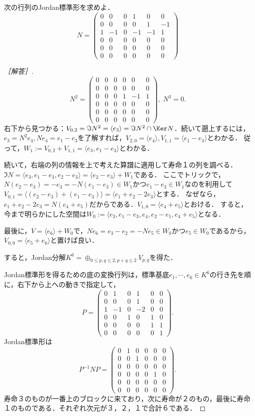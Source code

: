 \documentclass[uplatex, dvipdfmx]{jsreport}
\begin{document}
\begin{problem}
    次の行列のJordan標準形を求めよ．
    \[N=\begin{pmatrix}0&0&0&1&0&0\\0&0&0&0&1&-1\\1&-1&0&-1&-1&1\\0&0&0&0&0&0\\0&0&0&0&0&0\\0&0&0&0&0&0\end{pmatrix}\]
\end{problem}
\begin{proof}[［解答］]
    \[N^2=\begin{pmatrix}0&0&0&0&0&0\\0&0&0&0&0&0\\0&0&0&1&-1&1\\0&0&0&0&0&0\\0&0&0&0&0&0\\0&0&0&0&0&0\end{pmatrix},\;N^3=0.\]
    右下から見つかる：$V_{0,2}=\Im N^2=\langle e_3\rangle=\Im N^2\cap\Ker N$．続いて遡上するには，$e_3=N^2e_4,Ne_4=e_1-e_3$を了解すれば，$V_{2,0}=\langle  e_4\rangle,V_{1,1}=\langle e_1-e_3\rangle$とわかる．
    従って，$W_1:=V_{0,2}+V_{1,1}=\langle e_3,e_1-e_3\rangle$とわかる．

    続いて，右端の列の情報を上で考えた算譜に適用して寿命１の列を調べる．
    $\Im N=\langle  e_3,e_1-e_3,e_2-e_3\rangle=\langle e_2-e_3\rangle+W_1$である．
    ここでトリックで，$N(e_2-e_3)=-e_3=-N(e_1-e_3)\in W_1$かつ$e_1-e_3\in W_1$なのを利用して$V_{0,1}=\langle (e_2-e_3)+(e_1-e_3)\rangle =\langle e_1+e_2-2e_3\rangle$とする．
    なぜなら，$e_1+e_2-2e_3=N(e_4+e_5)$だからである．$V_{1,0}=\langle e_4+e_5\rangle$とおける．
    すると，今まで明らかにした空間は$W_0:=\langle e_3,e_1-e_3,e_4,e_2-e_1,e_4+e_5\rangle$となる．

    最後に，$V=\langle e_6\rangle +W_0$で，$Ne_6=e_3-e_2=-Ne_5\in W_0$かつ$e_5\in W_0$であるから，$V_{0,0}=\langle e_5+e_6\rangle$と置けば良い．

    すると，Jordan分解$K^6=\oplus_{0\le p,q\le 2,p+q\le 2}V_{p,q}$を得た．

    Jordan標準形を得るための底の変換行列は，標準基底$e_1,\cdots,e_6\in K^6$の行き先を順に，右下から上への動きで指定して，
    \[ P=\begin{pmatrix}0&1&0&1&0&0\\0&0&0&1&0&0\\1&-1&0&-2&0&0\\0&0&1&0&1&0\\0&0&0&0&1&1\\0&0&0&0&0&1\end{pmatrix}. \]
    Jordan標準形は
    \[ P^{-1}NP=\begin{pmatrix}0&1&0&0&0&0\\0&0&1&0&0&0\\0&0&0&0&0&0\\0&0&0&0&1&0\\0&0&0&0&0&0\\0&0&0&0&0&0\end{pmatrix}. \]
    寿命３のものが一番上のブロックに来ており，次に寿命が２のもの，最後に寿命１のものである．それぞれ次元が３，２，１で合計６である．
\end{proof}
\end{document}
